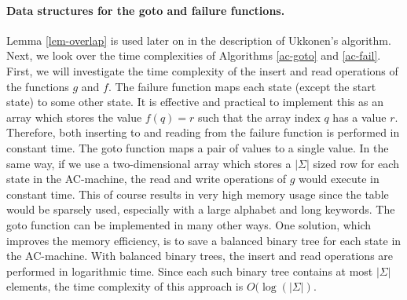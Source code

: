 \documentclass[english,twoside,censored,csm,algorithms-track-2020]{HYthesisML}
\theoremstyle{plain}
\theoremstyle{definition}
\begin{document}
\paragraph{Data structures for the goto and failure functions.}
Lemma \ref{lem-overlap} is used later on in the description of Ukkonen's algorithm. Next, we look
over the time complexities of Algorithms \ref{ac-goto} and \ref{ac-fail}. First, we will investigate
the time complexity of the insert and read operations of the functions $g$ and $f$. The failure
function maps each state (except the start state) to some other state. It is effective and practical
to implement this as an array which stores the value $f(q)=r$ such that the array index $q$ has
a value $r$. Therefore, both inserting to and reading from the failure function is performed
in constant time. The goto function maps a pair of values to a single value.
In the same way, if we use a two-dimensional array which stores
a $|\Sigma|$ sized row for each state in the AC-machine, the read and write operations of $g$ would
execute in constant time. This of course results in very high memory usage since the table would be
sparsely used, especially with a large alphabet and long keywords. The goto function can
be implemented in many other ways. One solution, which improves the memory efficiency, is to save
a balanced binary tree for each state in the AC-machine. With balanced binary trees, the insert and read
operations are performed in logarithmic time. Since each such binary tree contains at most $|\Sigma|$
elements, the time complexity of this approach is $O(\log(|\Sigma|)$.
\end{document}
